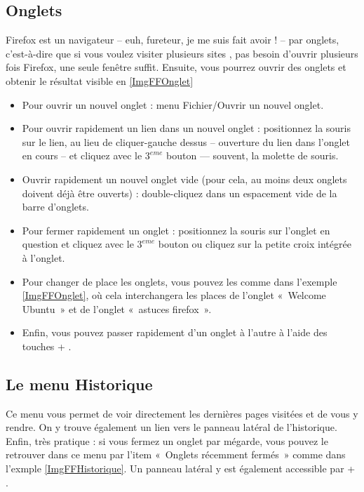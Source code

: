 \subsection{Onglets}
\label{RefFFOnglets}
Firefox est un navigateur -- euh, fureteur, je me suis fait avoir ! --  par onglets, c'est-à-dire que si vous voulez visiter plusieurs sites , pas besoin d'ouvrir plusieurs fois Firefox, une seule fenêtre suffit. Ensuite, vous pourrez ouvrir des onglets et obtenir le résultat visible en \ref{ImgFFOnglet}\par
{}
\begin{itemize}
\item Pour ouvrir un nouvel onglet : menu Fichier/Ouvrir un nouvel onglet.
\item Pour ouvrir rapidement un lien dans un nouvel onglet : positionnez la souris sur le lien, au lieu de cliquer-gauche dessus -- ouverture du lien dans l'onglet en cours -- et cliquez avec le $3^{eme}$ bouton --- souvent, la molette de souris.
\item Ouvrir rapidement un nouvel onglet vide (pour cela, au moins deux onglets doivent déjà être ouverts) : double-cliquez dans un espacement vide de la barre d'onglets.
\item Pour fermer rapidement un onglet : positionnez la souris sur l'onglet en question et cliquez avec le $3^{eme}$ bouton ou cliquez sur la petite croix intégrée à l'onglet.
\item Pour changer de place les onglets, vous pouvez les  comme dans l'exemple \ref{ImgFFOnglet}, où cela interchangera les places de l'onglet «~Welcome Ubuntu~» et de l'onglet «~astuces firefox~».
\item Enfin, vous pouvez passer rapidement d'un onglet à l'autre à l'aide des touches  + .
\end{itemize}
\subsection{Le menu Historique}
Ce menu vous permet de voir directement les dernières pages visitées et de vous y rendre. On y trouve également un lien vers le panneau latéral de l'historique. Enfin, très pratique : si vous fermez un onglet par mégarde, vous pouvez le retrouver dans ce menu par l'item «~Onglets récemment fermés~» comme dans l'exmple \ref{ImgFFHistorique}. Un panneau latéral y est également accessible par  + .
